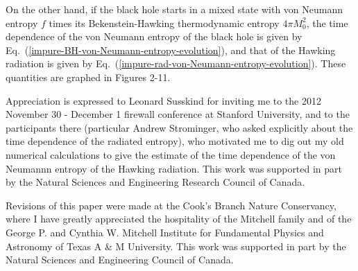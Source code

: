 \documentclass[12pt]{article}
\begin{document}
On the other hand, if the black hole starts in a mixed state with von Neumann entropy $f$ times its Bekenstein-Hawking thermodynamic entropy $4\pi M_0^2$, the time dependence of the von Neumann entropy of the black hole is given by Eq.\ (\ref{impure-BH-von-Neumann-entropy-evolution}), and that of the Hawking radiation is given by Eq.\ (\ref{impure-rad-von-Neumann-entropy-evolution}).  These quantities are graphed in Figures 2-11.



Appreciation is expressed to Leonard Susskind for inviting me to the 2012 November 30 - December 1 firewall conference at Stanford University, and to the participants there (particular Andrew Strominger, who asked explicitly about the time dependence of the radiated entropy), who motivated me to dig out my old numerical calculations to give the estimate of the time dependence of the von Neumannn entropy of the Hawking radiation.  This work was supported in part by the Natural Sciences and Engineering Research Council of Canada.

Revisions of this paper were made at the Cook's Branch Nature Conservancy, where I have greatly appreciated the hospitality of the Mitchell family and of the George P. and Cynthia W. Mitchell Institute for Fundamental Physics and Astronomy of Texas A \& M University.  This work was supported in part by the Natural Sciences and Engineering Council of Canada.


\newpage

\baselineskip 4pt
\end{document}
